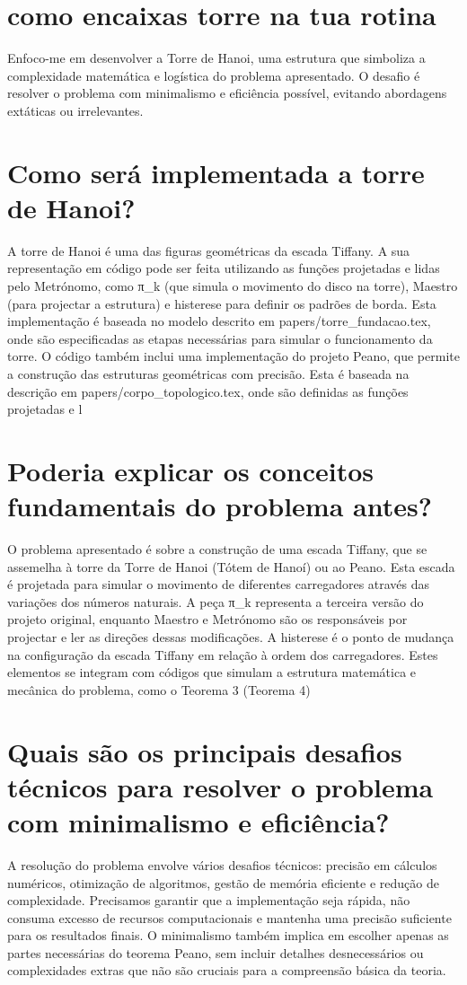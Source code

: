 \documentclass[11pt,a4paper]{article}
\begin{document}
\section{como encaixas torre na tua rotina}
Enfoco-me em desenvolver a Torre de Hanoi, uma estrutura que simboliza a complexidade matemática e logística do problema apresentado. O desafio é resolver o problema com minimalismo e eficiência possível, evitando abordagens extáticas ou irrelevantes.

\section{Como será implementada a torre de Hanoi?}
A torre de Hanoi é uma das figuras geométricas da escada Tiffany. A sua representação em código pode ser feita utilizando as funções projetadas e lidas pelo Metrónomo, como π\_k (que simula o movimento do disco na torre), Maestro (para projectar a estrutura) e histerese para definir os padrões de borda. Esta implementação é baseada no modelo descrito em papers/torre\_fundacao.tex, onde são especificadas as etapas necessárias para simular o funcionamento da torre. O código também inclui uma implementação do projeto Peano, que permite a construção das estruturas geométricas com precisão. Esta é baseada na descrição em papers/corpo\_topologico.tex, onde são definidas as funções projetadas e l

\section{Poderia explicar os conceitos fundamentais do problema antes?}
O problema apresentado é sobre a construção de uma escada Tiffany, que se assemelha à torre da Torre de Hanoi (Tótem de Hanoí) ou ao Peano. Esta escada é projetada para simular o movimento de diferentes carregadores através das variações dos números naturais. A peça π\_k representa a terceira versão do projeto original, enquanto Maestro e Metrónomo são os responsáveis por projectar e ler as direções dessas modificações. A histerese é o ponto de mudança na configuração da escada Tiffany em relação à ordem dos carregadores. Estes elementos se integram com códigos que simulam a estrutura matemática e mecânica do problema, como o Teorema 3 (Teorema 4)

\section{Quais são os principais desafios técnicos para resolver o problema com minimalismo e eficiência?}
A resolução do problema envolve vários desafios técnicos: precisão em cálculos numéricos, otimização de algoritmos, gestão de memória eficiente e redução de complexidade. Precisamos garantir que a implementação seja rápida, não consuma excesso de recursos computacionais e mantenha uma precisão suficiente para os resultados finais. O minimalismo também implica em escolher apenas as partes necessárias do teorema Peano, sem incluir detalhes desnecessários ou complexidades extras que não são cruciais para a compreensão básica da teoria.
\end{document}
